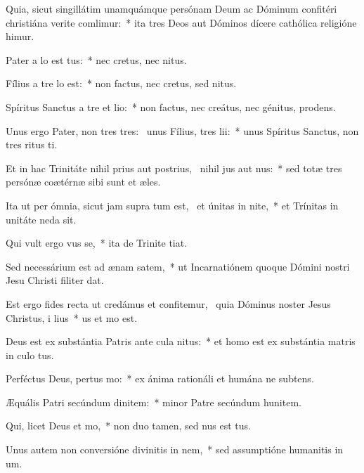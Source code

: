 \item Quia, sicut singillátim unamquámque persónam Deum ac Dóminum confitéri christiána verite comlimur:~* ita tres Deos aut Dóminos dícere cathólica religióne himur.
\item Pater a lo est tus:~* nec cretus, nec nitus.
\item Fílius a tre lo est:~* non factus, nec cretus, sed nitus.
\item Spíritus Sanctus a tre et lio:~* non factus, nec creátus, nec génitus,  prodens.
\item Unus ergo Pater, non tres tres:~\pscross{} unus Fílius,  tres lii:~* unus Spíritus Sanctus, non tres ritus ti.
\item Et in hac Trinitáte nihil prius aut postrius,~\pscross{} nihil jus aut nus:~* sed totæ tres persónæ coætérnæ sibi sunt et æles.
\item Ita ut per ómnia, sicut jam supra tum est,~\pscross{} et únitas in nite,~* et Trínitas in unitáte neda sit.
\item Qui vult ergo vus se,~* ita de Trinite tiat.
\item Sed necessárium est ad ænam satem,~* ut Incarnatiónem quoque Dómini nostri Jesu Christi filiter dat.
\item Est ergo fides recta ut credámus et confitemur,~\pscross{} quia Dóminus noster Jesus Christus, i lius~* us et mo est.
\item Deus est ex substántia Patris ante cula nitus:~* et homo est ex substántia matris in culo tus.
\item Perféctus Deus, pertus mo:~* ex ánima rationáli et humána ne subtens.
\item Æquális Patri secúndum dinitem:~* minor Patre secúndum hunitem.
\item Qui, licet Deus  et mo,~* non duo tamen, sed nus est tus.
\item Unus autem non conversióne divinitis in nem,~* sed assumptióne humanitis in um.
